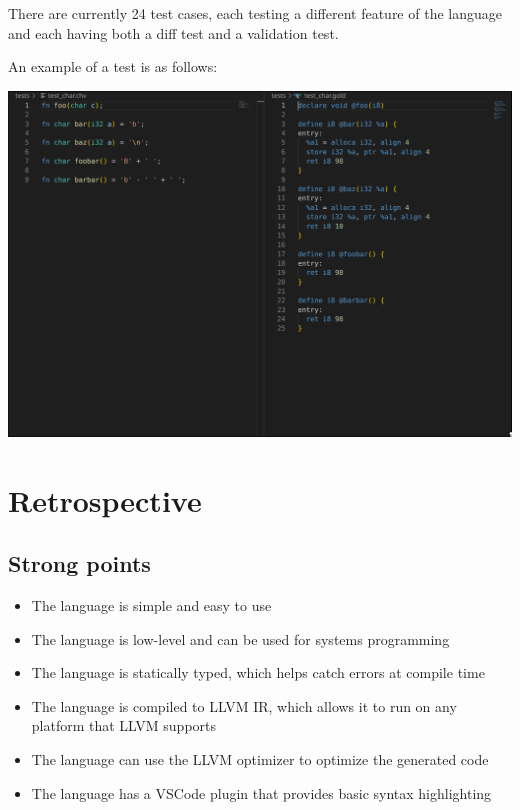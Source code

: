 There are currently 24 test cases, each testing a different feature of the language and each having both a diff test and a validation test.

An example of a test is as follows:
\begin{center}
  \includegraphics[width=1\textwidth]{images/test_example.png}
\end{center}

\section{Retrospective}
\subsection{Strong points}
\begin{itemize}
  \item The language is simple and easy to use
  \item The language is low-level and can be used for systems programming
  \item The language is statically typed, which helps catch errors at compile time
  \item The language is compiled to LLVM IR, which allows it to run on any platform that LLVM supports
  \item The language can use the LLVM optimizer to optimize the generated code
  \item The language has a VSCode plugin that provides basic syntax highlighting
\end{itemize}

